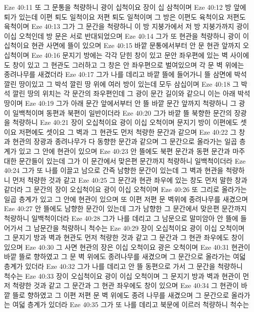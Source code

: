 Eze 40:11  또 그 문통을 척량하니 광이 십척이요 장이 십 삼척이며
Eze 40:12  방 앞에 퇴가 있는데 이편 퇴도 일척이요 저편 퇴도 일척이며 그 방은 이편도 육척이요 저편도 육척이며
Eze 40:13  그가 그 문간을 척량하니 이 방 지붕가에서 저 방 지붕가까지 광이 이십 오척인데 방 문은 서로 반대되었으며
Eze 40:14  그가 또 현관을 척량하니 광이 이십척이요 현관 사면에 뜰이 있으며
Eze 40:15  바깥 문통에서부터 안 문 현관 앞까지 오십척이며
Eze 40:16  문지기 방에는 각각 닫힌 창이 있고 문안 좌우편에 있는 벽 사이에도 창이 있고 그 현관도 그러하고 그 창은 안 좌우편으로 벌여있으며 각 문 벽 위에는 종려나무를 새겼더라
Eze 40:17  그가 나를 데리고 바깥 뜰에 들어가니 뜰 삼면에 박석 깔린 땅이있고 그 박석 깔린 땅 위에 여러 방이 있는데 모두 삼십이며
Eze 40:18  그 박석 깔린 땅의 위치는 각 문간의 좌우편인데 그 광이 문간 길이와 같으니 이는 아래 박석 땅이며
Eze 40:19  그가 아래 문간 앞에서부터 안 뜰 바깥 문간 앞까지 척량하니 그 광이 일백척이며 동편과 북편이 일반이더라
Eze 40:20  그가 바깥 뜰 북향한 문간의 장광을 척량하니
Eze 40:21  장이 오십척이요 광이 이십 오척이며 문지기 방이 이편에도 셋이요 저편에도 셋이요 그 벽과 그 현관도 먼저 척량한 문간과 같으며
Eze 40:22  그 창과 현관의 장광과 종려나무가 다 동향한 문간과 같으며 그 문간으로 올라가는 일곱 층계가 있고 그 안에 현관이 있으며
Eze 40:23  안 뜰에도 북편 문간과 동편 문간과 마주 대한 문간들이 있는데 그가 이 문간에서 맞은편 문간까지 척량하니 일백척이더라
Eze 40:24  그가 또 나를 이끌고 남으로 간즉 남향한 문간이 있는데 그 벽과 현관을 척량하니 먼저 척량한 것과 같고
Eze 40:25  그 문간과 현관 좌우에 있는 창도 먼저 말한 창과 같더라 그 문간의 장이 오십척이요 광이 이십 오척이며
Eze 40:26  또 그리로 올라가는 일곱 층계가 있고 그 안에 현관이 있으며 또 이편 저편 문 벽위에 종려나무를 새겼으며
Eze 40:27  안 뜰에도 남향한 문간이 있는데 그가 남향한 그 문간에서 맞은편 문간까지 척량하니 일백척이더라
Eze 40:28  그가 나를 데리고 그 남문으로 말미암아 안 뜰에 들어가서 그 남문간을 척량하니 척수는
Eze 40:29  장이 오십척이요 광이 이십 오척이며 그 문지기 방과 벽과 현관도 먼저 척량한 것과 같고 그 문간과 그 현관 좌우에도 창이 있으며
Eze 40:30  그 사면 현관의 장은 이십 오척이요 광은 오척이며
Eze 40:31  현관이 바깥 뜰로 향하였고 그 문 벽 위에도 종려나무를 새겼으며 그 문간으로 올라가는 여덟 층계가 있더라
Eze 40:32  그가 나를 데리고 안 뜰 동편으로 가서 그 문간을 척량하니 척수는
Eze 40:33  장이 오십척이요 광이 이십 오척이며 그 문지기 방과 벽과 현관이 먼저 척량한 것과 같고 그 문간과 그 현관 좌우에도 창이 있으며
Eze 40:34  그 현관이 바깥 뜰로 향하였고 그 이편 저편 문 벽 위에도 종려 나무를 새겼으며 그 문간으로 올라가는 여덟 층계가 있더라
Eze 40:35  그가 또 나를 데리고 북문에 이르러 척량하니 척수는
